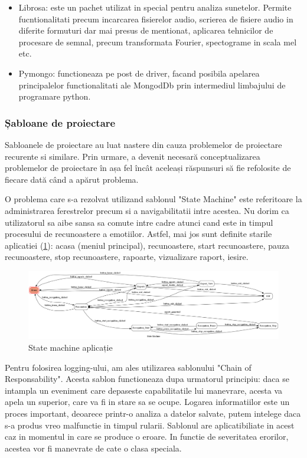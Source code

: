 \documentclass[a4paper, 12pt]{report}
\begin{document}
\begin{itemize}
		\item Librosa: este un pachet utilizat in special pentru analiza sunetelor. Permite fucntionalitati precum incarcarea fisierelor audio, scrierea de fisiere audio in diferite formuturi dar mai presus de mentionat, aplicarea tehnicilor de procesare de semnal, precum transformata Fourier, spectograme in scala mel etc.
		
		\item Pymongo: functioneaza pe post de driver, facand posibila apelarea principalelor functionalitati ale MongodDb prin intermediul limbajului de programare python.
	\end{itemize}
	
	\subsubsection{Șabloane de proiectare}
	Sabloanele de proiectare au luat nastere din cauza problemelor de proiectare recurente si similare. Prin urmare, a devenit necesară conceptualizarea problemelor de proiectare în așa fel încât aceleași răspunsuri să fie refolosite de fiecare dată când a apărut problema.
	
	O problema care s-a rezolvat utilizand sablonul "State Machine" este referitoare la administrarea ferestrelor precum si a navigabilitatii intre acestea. Nu dorim ca utilizatorul sa aibe sansa sa comute intre cadre atunci cand este in timpul procesului de recunoastere a emotiilor. Astfel, mai jos sunt definite starile aplicatiei (\ref{fig:state}): acasa (meniul principal), recunoastere, start recunoastere, pauza recunoastere, stop recunoastere, rapoarte, vizualizare raport, iesire.
	
	\begin{figure}[H]
		\begin{center}
			\includegraphics[scale=0.2]{images/state_diagram.png}
		\end{center}
		\caption{State machine aplicație}
		\label{fig:state}
	\end{figure} 	
	
	Pentru folosirea logging-ului, am ales utilizarea sablonului "Chain of Responsability". Acesta sablon functioneaza dupa urmatorul principiu: daca se intampla un eveniment care depaseste capabilitatile lui manevrare, acesta va apela un superior, care va fi in stare sa se ocupe. Logarea informatiilor este un proces important, deoarece printr-o analiza a datelor salvate, putem intelege daca s-a produs vreo malfunctie in timpul rularii. Sablonul are aplicatibiliate in acest caz in momentul in care se produce o eroare. In functie de severitatea erorilor, acestea vor fi manevrate de cate o clasa speciala.
\end{document}
